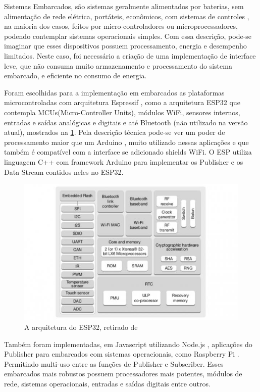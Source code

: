 Sistemas Embarcados, são sistemas geralmente alimentados por baterias, sem alimentação de rede elétrica, portáteis, econômicos, com sistemas de controles , na maioria dos casos, feitos por micro-controladores ou microprocessadores, podendo contemplar sistemas operacionais simples. Com essa descrição, pode-se imaginar que esses dispositivos possuem processamento, energia e desempenho limitados. Neste caso, foi necessário a criação de uma implementação de interface leve, que não consuma muito armazenamento e processamento do sistema embarcado, e eficiente no consumo de energia.

Foram escolhidas para a implementação em embarcados as plataformas microcontroladas com arquitetura Espressif \cite{espressif}, como a arquitetura ESP32 que contempla MCUs(Micro-Controller Units), módulos WiFi, sensores internos, entradas e saídas analógicas e digitais e até Bluetooth (não utilizado na versão atual), mostrados na \ref{fig:3.3.4/esp32-arch}. Pela descrição técnica pode-se ver um poder de processamento maior que um Arduino \cite{arduino}, muito utilizado nessas aplicações e que também é compatível com a interface se adicionado shields WiFi. O ESP utiliza linguagem C++ \cite{c++} com framework Arduino para implementar os Publisher e os Data Stream contidos neles no ESP32.

\begin{figure}[h!]
\centering
\includegraphics[width=13cm]{./02_Capitulos/02_Cap3/figures/espressif32-arch}
\caption{A arquitetura do ESP32, retirado de \cite{espressif}}
\label{fig:3.3.4/esp32-arch}
\end{figure}


Também foram implementadas, em Javascript  utilizando Node.js \cite{nodejs}, aplicações do Publisher para embarcados com sistemas operacionais, como Raspberry Pi \cite{raspberry-pi}. Permitindo multi-uso entre as funções de Publisher e Subscriber. Esses embarcados mais robustos possuem processadores mais potentes, módulos de rede, sistemas operacionais, entradas e saídas digitais entre outros.


